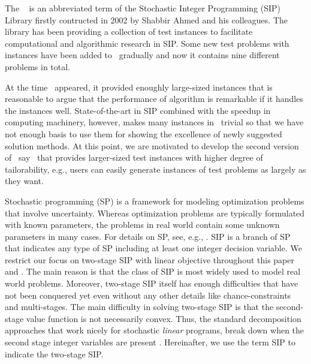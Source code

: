 The \siplib\ \cite{web:SIPLIB1} is an abbreviated term of the Stochastic Integer Programming (SIP) Library firstly contructed in 2002 by Shabbir Ahmed and his colleagues. The library has been providing a collection of test instances to facilitate computational and algorithmic research in SIP. Some new test problems with instances have been added to \siplib\ gradually and now it contains nine different problems in total. %

At the time \siplib\ appeared, it provided enoughly large-sized instances that is reasonable to argue that the performance of algorithm is remarkable if it handles the instances well. State-of-the-art in SIP combined with the speedup in computing machinery, however, makes many instances in \siplib\ trivial so that we have not enough basis to use them for showing the excellence of newly suggested solution methods. At this point, we are motivated to develop the second version of \siplib\, say \siplibtwo\ that provides larger-sized test instances with higher degree of tailorability, e.g., users can easily generate instances of test problems as largely as they want.%

Stochastic programming (SP) is a framework for modeling optimization problems that involve uncertainty. Whereas optimization problems are typically formulated with known parameters, the problems in real world contain some unknown parameters in many cases. For details on SP, see, e.g., \cite{web:SPS,book:BL2011}. SIP is a branch of SP that indicates any type of SP including at least one integer decision variable. We restrict our focus on two-stage SIP with linear objective throughout this paper and \siplibtwo. The main reason is that the class of SIP is most widely used to model real world problems. Moreover, two-stage SIP itself has enough difficulties that have not been conquered yet even without any other details like chance-constraints and multi-stages. The main difficulty in solving two-stage SIP is that the second-stage value function is not necessarily convex. Thus, the standard decomposition approaches that work nicely for stochastic \textit{linear} programs, break down when the second stage integer variables are present \cite{journal:AG2004}. Hereinafter, we use the term SIP to indicate the two-stage SIP.

